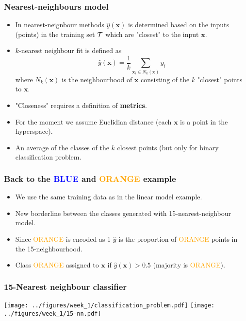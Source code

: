 \documentclass[notes]{beamer}          %
\newcommand{\vect}[1]{\bm{#1}}
\begin{document}
\begin{frame}
\frametitle{Nearest-neighbours model}
    \begin{itemize}
        \item In nearest-neignbour methods $\hat{y}(\vect{x})$ is determined based on the inputs (points) in the training set $\cal{T}$ which are "closest" to the input $\vect{x}$.
        \item $k$-nearest neighbour fit is defined as
        $$ \hat{y}(\vect{x}) = \frac{1}{k} \sum_{\vect{x}_i \in N_k(\vect{x})} y_i $$
        where $N_k(\vect{x})$ is the neighbourhood of $\vect{x}$ consisting of the $k$ "closest" points to $\vect{x}$.
        \item "Closeness" requires a definition of {\bf metrics}.
        \item For the moment we assume Euclidian distance (each $\vect{x}$ is a point in the hyperspace).
        \item An average of the classes of the $k$ closest points (but only for binary classification problem.
    \end{itemize}
\end{frame}

\begin{frame}
\frametitle{Back to the \textcolor{blue}{BLUE} and \textcolor{orange}{ORANGE} example}
    \begin{itemize}
        \item We use the same training data as in the linear model example.
        \item New borderline between the classes generated with 15-nearest-neighbour model.
        \item Since \textcolor{orange}{ORANGE} is encoded as 1 $\hat{y}$ is the proportion of \textcolor{orange}{ORANGE} points in the 15-neighbourhood.
        \item Class \textcolor{orange}{ORANGE} assigned to $\vect{x}$ if $\hat{y}(\vect{x}) > 0.5$ (majority is \textcolor{orange}{ORANGE}).
    \end{itemize}
\end{frame}

\begin{frame}
\frametitle{15-Nearest neighbour classifier}
    \begin{center}
        \texttt{[image: ../figures/week\_1/classification\_problem.pdf]}
        \hfill
        \texttt{[image: ../figures/week\_1/15-nn.pdf]}
    \end{center}
\end{frame}
\end{document}
